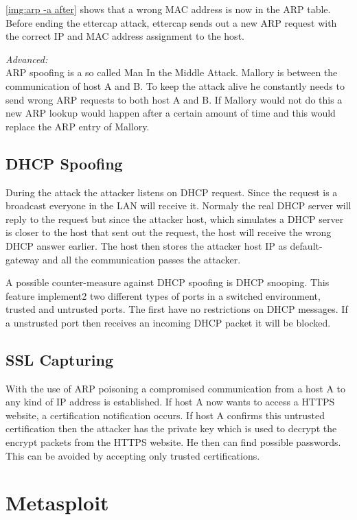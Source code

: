 \autoref{img:arp -a after} shows that a wrong \ac{MAC} address is now in the \ac{ARP} table.
Before ending the ettercap attack, ettercap sends out a new \ac{ARP} request with the correct \ac{IP} and \ac{MAC} address assignment to the host.

\textit{Advanced:}\\
\ac{ARP} spoofing is a so called Man In the Middle Attack. Mallory is between the communication of host A and B. To keep the attack alive he constantly needs to send wrong \ac{ARP} requests to both host A and B. If Mallory would not do this a new \ac{ARP} lookup would happen after a certain amount of time and this would replace the \ac{ARP} entry of Mallory.

\section{DHCP Spoofing}

During the attack the attacker listens on \ac{DHCP} request. Since the request is a broadcast everyone in the LAN will receive it. Normaly the real \ac{DHCP} server will reply to the request but since the attacker host, which simulates a \ac{DHCP} server is closer to the host that sent out the request, the host will receive the wrong \ac{DHCP} answer earlier. The host then stores the attacker host IP as default-gateway and all the communication passes the attacker.

A possible counter-measure against \ac{DHCP} spoofing is \ac{DHCP} snooping. This feature implement2 two different types of ports in a switched environment, trusted and untrusted ports. The first have no restrictions on \ac{DHCP} messages. If a unstrusted port then receives an incoming \ac{DHCP} packet it will be blocked.

\section{SSL Capturing}

With the use of \ac{ARP} poisoning a compromised communication from a host A to any kind of \ac{IP} address is established. If host A now wants to access a \ac{HTTPS} website, a certification notification occurs. If host A confirms this untrusted certification then the attacker has the private key which is used to decrypt the encrypt packets from the \ac{HTTPS} website. He then can find possible passwords.
This can be avoided by accepting only trusted certifications.

\chapter{Metasploit}

